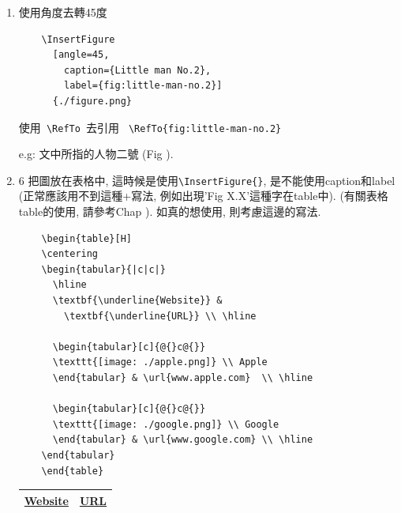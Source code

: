 \begin{enumerate}
  \newpage
  \item
  {
    使用角度去轉45度
    \begin{verbatim}
    \InsertFigure
      [angle=45,
        caption={Little man No.2},
        label={fig:little-man-no.2}]
      {./figure.png}
    \end{verbatim}

    使用\verb| \RefTo |去引用 \verb| \RefTo{fig:little-man-no.2} |

    e.g: 文中所指的人物二號 (Fig ).
  } %

  \newpage
  \item
  {6
    把圖放在表格中, 這時候是使用\verb|\InsertFigure{}|, 是不能使用caption和label (正常應該用不到這種+寫法, 例如出現'Fig X.X'這種字在table中). (有關表格table的使用, 請參考Chap ). 如真的想使用, 則考慮這邊的寫法.

    \begin{verbatim}
    \begin{table}[H]
    \centering
    \begin{tabular}{|c|c|}
      \hline
      \textbf{\underline{Website}} &
        \textbf{\underline{URL}} \\ \hline

      \begin{tabular}[c]{@{}c@{}}
      \texttt{[image: ./apple.png]} \\ Apple
      \end{tabular} & \url{www.apple.com}  \\ \hline

      \begin{tabular}[c]{@{}c@{}}
      \texttt{[image: ./google.png]} \\ Google
      \end{tabular} & \url{www.google.com} \\ \hline
    \end{tabular}
    \end{table}
    \end{verbatim}

    \begin{table}[H]
    \centering
    \label{table:how-to:write:figure:insert-figure-into-table}
    \begin{tabular}{|c|c|}
      \hline
      \textbf{\underline{Website}} &
        \textbf{\underline{URL}} \\ \hline


\end{tabular}
\end{table}}
\end{enumerate}
